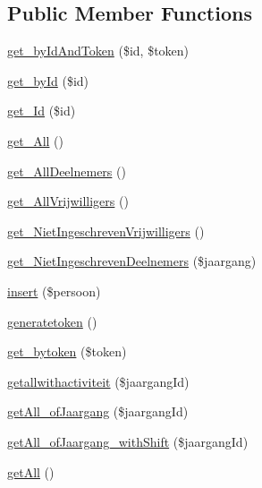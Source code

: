 \subsection*{Public Member Functions}
\begin{DoxyCompactItemize}
\item 
\mbox{\hyperlink{class_persoon__model_af6238e2ada132ef41f5ab612f027c879}{get\+\_\+by\+Id\+And\+Token}} (\$id, \$token)
\item 
\mbox{\hyperlink{class_persoon__model_a0b88e4e63e880d5c6a5c18a12ac21272}{get\+\_\+by\+Id}} (\$id)
\item 
\mbox{\hyperlink{class_persoon__model_ac4bd47d927cdbaa39a26b723f4c15aa7}{get\+\_\+\+Id}} (\$id)
\item 
\mbox{\hyperlink{class_persoon__model_abf1694b8c451d02fb36b9fe6d6f54245}{get\+\_\+\+All}} ()
\item 
\mbox{\hyperlink{class_persoon__model_af681009d10a4938d8df855aaadff3f8c}{get\+\_\+\+All\+Deelnemers}} ()
\item 
\mbox{\hyperlink{class_persoon__model_a3ec3c4838d03ea025746333367305dfc}{get\+\_\+\+All\+Vrijwilligers}} ()
\item 
\mbox{\hyperlink{class_persoon__model_a4402d0963685ffa0de9bba1ec29c4b60}{get\+\_\+\+Niet\+Ingeschreven\+Vrijwilligers}} ()
\item 
\mbox{\hyperlink{class_persoon__model_a57ca8d2df6874e19154b614986f1a7a5}{get\+\_\+\+Niet\+Ingeschreven\+Deelnemers}} (\$jaargang)
\item 
\mbox{\hyperlink{class_persoon__model_a2c311e5cb508141c1bae2566b3169615}{insert}} (\$persoon)
\item 
\mbox{\hyperlink{class_persoon__model_ae56b3007dd99ca0a98820a33228fc87a}{generatetoken}} ()
\item 
\mbox{\hyperlink{class_persoon__model_a779aefc3d6ce88de6a5f5eb9be057883}{get\+\_\+bytoken}} (\$token)
\item 
\mbox{\hyperlink{class_persoon__model_a72d8c06b34d07ca558ec53c759996b60}{getallwithactiviteit}} (\$jaargang\+Id)
\item 
\mbox{\hyperlink{class_persoon__model_ad60023155e1b4bf3279227284647bc2d}{get\+All\+\_\+of\+Jaargang}} (\$jaargang\+Id)
\item 
\mbox{\hyperlink{class_persoon__model_abe2394803431cfb447887c36bba2b8eb}{get\+All\+\_\+of\+Jaargang\+\_\+with\+Shift}} (\$jaargang\+Id)
\item 
\mbox{\hyperlink{class_persoon__model_a82a921cf28a86b52a32d48235e30c0f1}{get\+All}} ()
\end{DoxyCompactItemize}


